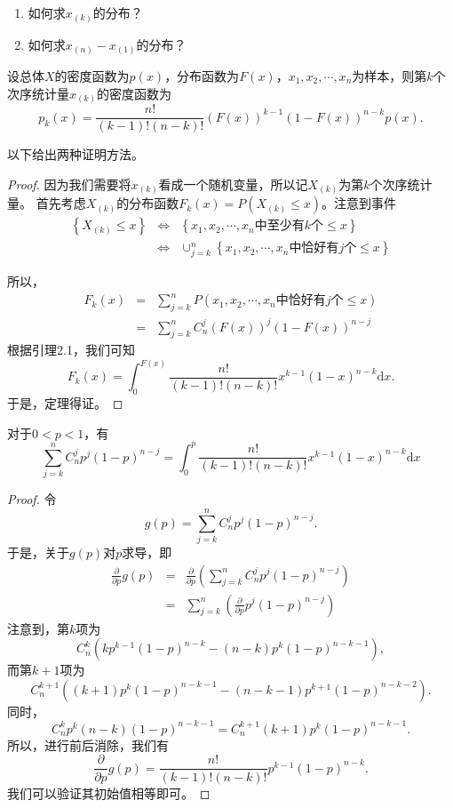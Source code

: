 \begin{problem}
\begin{enumerate}
    \item 如何求$x_{(k)}$的分布？
    \item 如何求$x_{(n)} - x_{(1)}$的分布？
\end{enumerate}
\end{problem}



\begin{theorem}
设总体$X$的密度函数为$p(x)$，分布函数为$F(x)$，$x_1,x_2,\cdots,x_n$为样本，则第$k$个次序统计量$x_{(k)}$的密度函数为
$$
p_k(x) = \frac{n!}{(k-1)!(n-k)!} (F(x))^{k-1} (1-F(x))^{n-k} p(x).
$$
\end{theorem}
以下给出两种证明方法。
\begin{proof}
    因为我们需要将$x_{(k)}$看成一个随机变量，所以记$X_{(k)}$为第$k$个次序统计量。
    首先考虑$X_{(k)}$的分布函数$F_{k}(x) = P(X_{(k)}\leq x)$。注意到事件
    \begin{eqnarray*}
        \left\{
    X_{(k)} \leq x
    \right\} &\Leftrightarrow& \left\{
    x_1,x_2,\cdots,x_n\text{中至少有$k$个}\leq x
    \right\} \\
    &\Leftrightarrow& \cup_{j=k}^{n} \left\{
    x_1,x_2,\cdots,x_n\text{中恰好有$j$个}\leq x
    \right\}
    \end{eqnarray*}
    
    所以，
    \begin{eqnarray*}
        F_k(x) 
        &=& \sum_{j=k}^n P\left( x_1,x_2,\cdots,x_n\text{中恰好有$j$个}\leq x \right)\\
        &=&\sum_{j=k}^n  C_{n}^j (F(x))^{j} (1-F(x))^{n-j}
    \end{eqnarray*}
    根据引理2.1，我们可知
    $$
     F_k(x) = \int_{0}^{F(x)} \frac{n!}{(k-1)!(n-k)!} x^{k-1}(1-x)^{n-k}\text{d}x.
    $$
    于是，定理得证。
\end{proof}

\begin{lemma}
    对于$0<p<1$，有
    $$
    \sum_{j=k}^n C_n^j p^j(1-p)^{n-j} = \int_{0}^p \frac{n!}{(k-1)!(n-k)!} x^{k-1}(1-x)^{n-k}\text{d}x
    $$
\end{lemma}
\begin{proof}
    令$$
    g(p) =  \sum_{j=k}^n C_n^j p^j(1-p)^{n-j}.
    $$
    于是，关于$g(p)$对$p$求导，即
    \begin{eqnarray*}
        \frac{\partial }{\partial p} g(p) &=&  \frac{\partial }{\partial p}\left( \sum_{j=k}^n C_n^j p^j(1-p)^{n-j}\right)\\
        &=& \sum_{j=k}^n \left(\frac{\partial }{\partial p}  p^j(1-p)^{n-j}\right)
    \end{eqnarray*}
    注意到，第$k$项为$$
C_n^k\left(k p^{k-1}(1-p)^{n-k}-(n-k)p^{k}(1-p)^{n-k-1}\right),$$
而第$k+1$项为
$$
C_n^{k+1}\left((k+1) p^{k}(1-p)^{n-k-1}-(n-k-1) p^{k+1}(1-p)^{n-k-2}\right).$$
同时，
$$
C_n^k p^{k}(n-k)(1-p)^{n-k-1} = C_n^{k+1}(k+1) p^{k}(1-p)^{n-k-1}.
$$
所以，进行前后消除，我们有
$$\frac{\partial}{\partial p} g(p)=\frac{n !}{(k-1) !(n-k) !} p^{k-1}(1-p)^{n-k}.$$
我们可以验证其初始值相等即可。
\end{proof}

